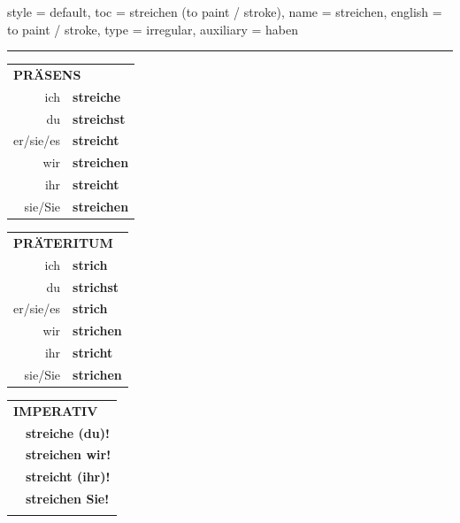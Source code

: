 \begin{verbentry}{
  style = {default},
  toc = {streichen (to paint / stroke)},
  name = {streichen},
  english = {to paint / stroke},
  type = {irregular},
  auxiliary = {haben}
}
 
    
     \vspace{5pt}

    \hrule
    
    \vspace{5pt}

  \begin{tabular}{rl}
     \multicolumn{2}{l}{\textbf{PRÄSENS} }\\
    ich & \textbf{streiche}\\
    du & \textbf{streichst}\\
    er/sie/es & \textbf{streicht}\\
    wir & \textbf{streichen}\\
    ihr & \textbf{streicht}\\
    sie/Sie & \textbf{streichen}\\
  \end{tabular}
  \hfill
  \begin{tabular}{rl}
    \multicolumn{2}{l}{\textbf{PRÄTERITUM} }\\
    ich & \textbf{strich}\\
    du & \textbf{strichst}\\
    er/sie/es & \textbf{strich}\\
    wir & \textbf{strichen}\\
    ihr & \textbf{stricht}\\
    sie/Sie & \textbf{strichen}\\
  \end{tabular}
  \hfill
  \begin{tabular}{rl}
     \multicolumn{2}{l}{\textbf{IMPERATIV} }\\
   & \textbf{streiche (du)!}\\
   & \textbf{streichen wir!}\\
   & \textbf{streicht (ihr)!}\\
   & \textbf{streichen Sie!}\\
   & \vspace{10pt}
  \end{tabular}

 \vspace{10pt}


\end{verbentry}
